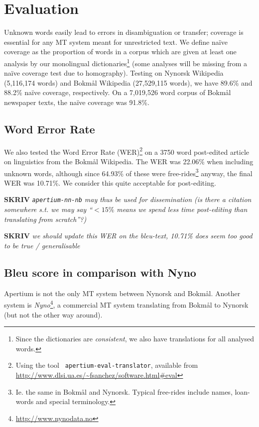 \documentclass[11pt]{article}
\newcommand{\comment}[1]{\textbf{SKRIV} {\it #1}}
\begin{document}
\section{Evaluation}
\label{sec:eval}

Unknown words easily lead to errors in disambiguation or transfer;
coverage is essential for any MT system meant for unrestricted text.
 We define naïve coverage as the proportion of words in a corpus which
are given at least one analysis by our monolingual
dictionaries\footnote{Since the dictionaries are \emph{consistent}, we
  also have translations for all analysed words.} (some analyses will
be missing from a naïve coverage test due to homography). Testing on
Nynorsk Wikipedia (5,116,174 words) and Bokmål Wikipedia (27,529,115
words), we have 89.6\% and 88.2\% naïve coverage, respectively. On a
7,019,526 word corpus of Bokmål newspaper texts, the naïve coverage
was 91.8\%. 

\subsection{Word Error Rate}
\label{sec:WER}
We also tested the Word Error Rate (WER)\footnote{Using the tool {\tt
    apertium-eval-translator}, available from
  \href{http://www.dlsi.ua.es/~fsanchez/software.html\#eval}{http://www.dlsi.ua.es/\~{}fsanchez/software.html\#eval}}
on a 3750 word post-edited article on linguistics from the Bokmål
Wikipedia. The WER was 22.06\% when including unknown words, although
since 64.93\% of these were free-rides\footnote{Ie. the same
  in Bokmål and Nynorsk. Typical free-rides include names, loan-words
  and special terminology.} anyway, the final WER was 10.71\%. We
consider this quite acceptable for post-editing.

\comment{ {\tt apertium-nn-nb} may thus be used for dissemination (is
there a citation somewhere s.t. we may say ``$<15\%$ means we spend less
time post-editing than translating from scratch''?)}

\comment{ we should update this WER on the bleu-text, 10.71\%
does seem too good to be true / generalisable}

\subsection{Bleu score in comparison with Nyno}

Apertium is not the only MT system between Nynorsk and Bokmål. Another
system is
\textit{Nyno}\footnote{\href{http://www.nynodata.no}{http://www.nynodata.no}},
a commercial MT system translating from Bokmål to Nynorsk (but not the
other way around). 
\end{document}
